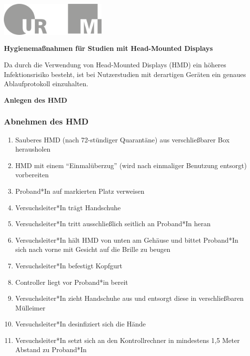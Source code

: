 \documentclass[24pt, a4paper, portrait]{article}
\begin{document}
\pagestyle{empty}

\raggedleft

\includegraphics[width=0.4\textwidth]{logo}

\vspace{1cm}
\sffamily
\centering
\huge

\textbf{Hygienemaßnahmen für Studien mit Head-Mounted Displays}

\vspace{1cm}

\raggedright
\Large

Da durch die Verwendung von Head-Mounted Displays (HMD) ein höheres Infektionsrisiko besteht, ist bei Nutzerstudien mit derartigen Geräten ein genaues Ablaufprotokoll einzuhalten.

\vspace{0.5cm}

\textbf{Anlegen des HMD}

\large

\subsubsection{Abnehmen des HMD}

\begin{enumerate}
    \item Sauberes HMD (nach 72-stündiger Quarantäne) aus verschließbarer Box herausholen
    \item HMD mit einem “Einmalüberzug” (wird nach einmaliger Benutzung entsorgt) vorbereiten
    \item Proband*In auf markierten Platz verweisen 
    \item Versuchsleiter*In trägt Handschuhe
    \item Versuchsleiter*In tritt ausschließlich seitlich an Proband*In heran
    \item Versuchsleiter*In hält HMD von unten am Gehäuse und bittet Proband*In sich nach vorne mit Gesicht auf die Brille zu beugen 
    \item Versuchsleiter*In befestigt Kopfgurt 
    \item Controller liegt vor Proband*in bereit 
    \item Versuchsleiter*In zieht Handschuhe aus und entsorgt diese in verschließbaren Mülleimer
    \item Versuchsleiter*In desinfiziert sich die Hände
    \item Versuchsleiter*In setzt sich an den Kontrollrechner in mindestens 1,5 Meter Abstand zu Proband*In
\end{enumerate}
\end{document}
